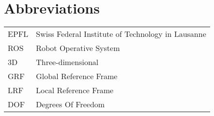 \section{Abbreviations}
\begin{flushleft}
\begin{tabular}{l l}
EPFL & Swiss Federal Institute of Technology in Lausanne\\
ROS & Robot Operative System\\
3D & Three-dimensional\\
GRF & Global Reference Frame\\
LRF & Local Reference Frame\\
DOF & Degrees Of Freedom\\
\end{tabular}
\end{flushleft}

